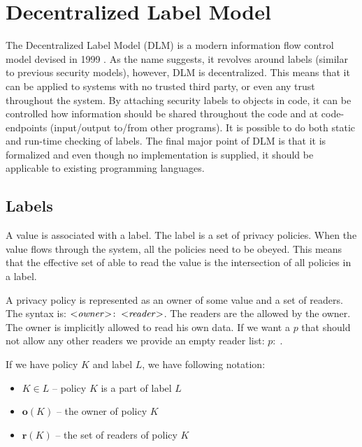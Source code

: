 
\newcommand{\policy}[2]{\ensuremath{#1\!:\;#2}}

\section{Decentralized Label Model}
The Decentralized Label Model (DLM) is a modern information flow control model devised in 1999 \cite{myers1999mostly}.
As the name suggests, it revolves around labels (similar to previous security models), however, DLM is decentralized.
This means that it can be applied to systems with no trusted third party, or even any trust throughout the system.
By attaching security labels to objects in code, it can be controlled how information should be shared throughout the code and at code-endpoints (input/output to/from other programs).
It is possible to do both static and run-time checking of labels.
The final major point of DLM is that it is formalized and even though no implementation is supplied, it should be applicable to existing programming languages.

\newcommand{\xvalue}{value}
\newcommand{\xvalues}{values}

\subsection{Labels}
A \xvalue{} is associated with a label.
The label is a set of privacy policies.
When the \xvalue{} flows through the system, all the policies need to be obeyed.
This means that the effective set of \principals{} able to read the \xvalue{} is the intersection of all policies in a label.

A privacy policy is represented as an owner of some \xvalue{} and a set of readers.
The syntax is: $\policy{\text{<\emph{owner}>}}{\text{<\emph{reader}>}}$.
The readers are the \principals{} allowed by the owner.
The owner is implicitly allowed to read his own data.
If we want a \principal{} $p$ that should not allow any other readers we provide an empty reader list: $\policy{p}{}$.

If we have policy $K$ and label $L$, we have following notation:
\begin{itemize}
\item $K \in L$ -- policy $K$ is a part of label $L$
\item $\textbf{o}(K)$ -- the owner of policy $K$
\item $\textbf{r}(K)$ -- the set of readers of policy $K$
\end{itemize}

